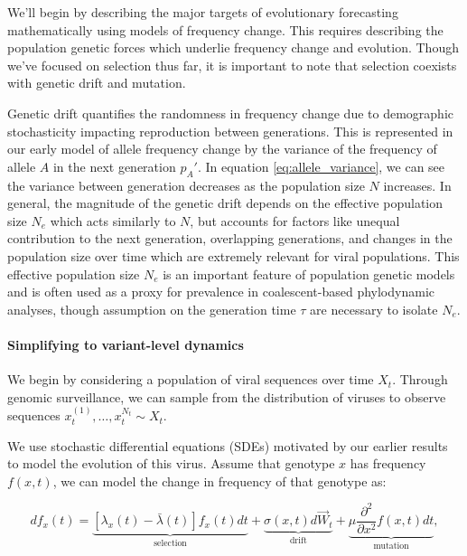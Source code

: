 We'll begin by describing the major targets of evolutionary forecasting mathematically using models of frequency change.
This requires describing the population genetic forces which underlie frequency change and evolution.
Though we've focused on selection thus far, it is important to note that selection coexists with genetic drift and mutation.

Genetic drift quantifies the randomness in frequency change due to demographic stochasticity impacting reproduction between generations.
This is represented in our early model of allele frequency change by the variance of the frequency of allele $A$ in the next generation $p_A'$.
In equation \ref{eq:allele_variance}, we can see the variance between generation decreases as the population size $N$ increases.
In general, the magnitude of the genetic drift depends on the effective population size $N_e$ which acts similarly to $N$, but accounts for factors like unequal contribution to the next generation, overlapping generations, and changes in the population size over time which are extremely relevant for viral populations.
This effective population size $N_e$ is an important feature of population genetic models and is often used as a proxy for prevalence in coalescent-based phylodynamic analyses, though assumption on the generation time $\tau$ are necessary to isolate $N_e$. \cite{MullerWagner2021}

\paragraph{Simplifying to variant-level dynamics}

We begin by considering a population of viral sequences over time $X_t$.
Through genomic surveillance, we can sample from the distribution of viruses to observe sequences $x_t^{(1)}, \ldots, x_t^{{N_t}} \sim X_t$.

We use stochastic differential equations (SDEs) motivated by our earlier results to model the evolution of this virus.
Assume that genotype $x$ has frequency $f(x, t)$, we can model the change in frequency of that genotype as:

\begin{equation}
  df_x(t) = \underbrace{\left[\lambda_{x}(t) - \bar{\lambda}(t)\right] f_x(t) dt}_{\text{selection}} + \underbrace{\sigma(x, t) d\vec{W}_{t}}_{\text{drift}} + \underbrace{\mu \frac{\partial^2 }{\partial x^2} f(x,t) dt}_{\text{mutation}},
\end{equation}

